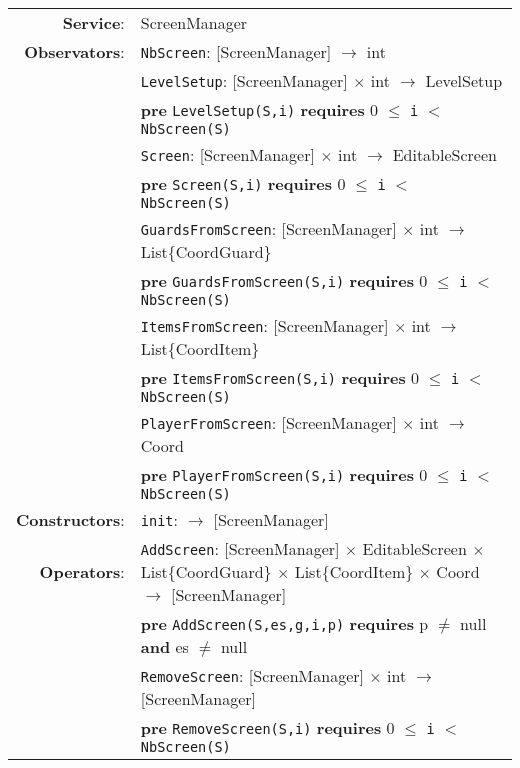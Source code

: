 \documentclass[7pt]{article}
\begin{document}
\begin{tabular}{rl}
\textbf{Service}: & \textrm{ScreenManager}  \\
\textbf{Observators}: & \texttt{NbScreen}: \textrm{[ScreenManager]} $\rightarrow$ \textrm{int} \\
& \texttt{LevelSetup}: \textrm{[ScreenManager]} $\times$ \textrm{int} $\rightarrow$ \textrm{LevelSetup} \\
& \quad \textbf{pre } \texttt{LevelSetup(S,i)} \textbf{ requires } 0 $\leq$ \texttt{i} $<$ \texttt{NbScreen(S)}\\
& \texttt{Screen}: \textrm{[ScreenManager]} $\times$ \textrm{int} $\rightarrow$ \textrm{EditableScreen} \\
& \quad \textbf{pre } \texttt{Screen(S,i)} \textbf{ requires } 0 $\leq$ \texttt{i} $<$ \texttt{NbScreen(S)}\\
& \texttt{GuardsFromScreen}: \textrm{[ScreenManager]} $\times$ \textrm{int} $\rightarrow$ \textrm{List\{CoordGuard\}} \\
& \quad \textbf{pre } \texttt{GuardsFromScreen(S,i)} \textbf{ requires } 0 $\leq$ \texttt{i} $<$ \texttt{NbScreen(S)}\\
& \texttt{ItemsFromScreen}: \textrm{[ScreenManager]} $\times$ \textrm{int} $\rightarrow$ \textrm{List\{CoordItem\}} \\
& \quad \textbf{pre } \texttt{ItemsFromScreen(S,i)} \textbf{ requires } 0 $\leq$ \texttt{i} $<$ \texttt{NbScreen(S)}\\
& \texttt{PlayerFromScreen}: \textrm{[ScreenManager]} $\times$ \textrm{int} $\rightarrow$ \textrm{Coord} \\
& \quad \textbf{pre } \texttt{PlayerFromScreen(S,i)} \textbf{ requires } 0 $\leq$ \texttt{i} $<$ \texttt{NbScreen(S)}\\
\textbf{Constructors}: & \texttt{init}: $\rightarrow$ \textrm{[ScreenManager]} \\
\textbf{Operators}: & \texttt{AddScreen}: \textrm{[ScreenManager]} $\times$ \textrm{EditableScreen} $\times$ \textrm{List\{CoordGuard\}}   $\times$ \textrm{List\{CoordItem\}} $\times$  \textrm{Coord} $\rightarrow$ \textrm{[ScreenManager]} \\
& \quad \textbf{pre } \texttt{AddScreen(S,es,g,i,p)} \textbf{ requires } p $\neq$ null \textbf{and} es $\neq$ null \\
& \texttt{RemoveScreen}: \textrm{[ScreenManager]} $\times$ \textrm{int}  $\rightarrow$ \textrm{[ScreenManager]} \\
& \quad \textbf{pre } \texttt{RemoveScreen(S,i)} \textbf{ requires } 0 $\leq$ \texttt{i} $<$ \texttt{NbScreen(S)} \\


\end{tabular}
\end{document}
